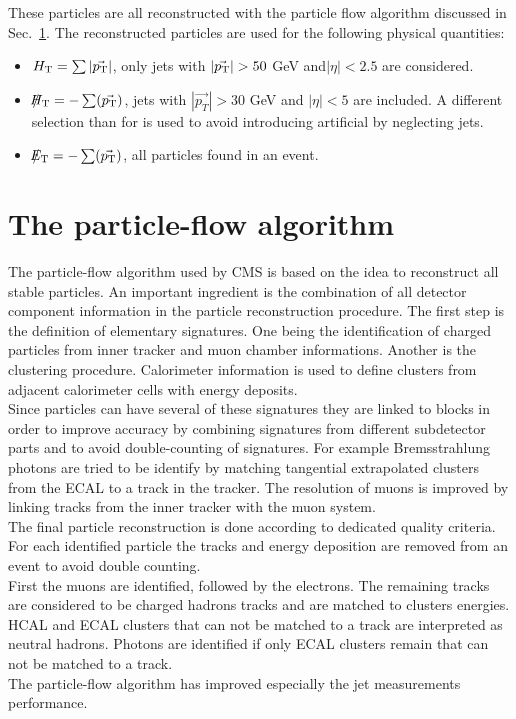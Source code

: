 These particles are all reconstructed with the particle flow algorithm discussed in  Sec.~\ref{sec:particleflow}. The reconstructed particles are used for the following physical quantities:
\begin{itemize}
 \item $H_{\text{T}}=\sum|\vec{p_{\text{T}}}|$, only jets with $|\vec{p_{\text{T}}}| > 50 $ GeV and$|\eta| < 2.5$ are considered.
 \item $\slash\mkern-12mu{H}_{\text{T}} = -\sum (\vec{p_{\text{T}}})$, jets with $|\vec{p_{T}}| > 30$ GeV and $|\eta| < 5$ are included. A different selection than for \HT is used to avoid introducing artificial \MHT by neglecting jets.
 \item $\slash\mkern-12mu{E}_{\text{T}} = -\sum (\vec{p_{\text{T}}})$, all particles \pt found in an event.
\end{itemize}


\section{The particle-flow algorithm}
\label{sec:particleflow}

The particle-flow algorithm used by CMS is based on the idea to reconstruct all stable particles. An important ingredient is the combination of all detector component information in the particle reconstruction procedure. 
The first step is the definition of elementary signatures. One being the identification of charged particles from inner tracker and muon chamber informations. Another is the clustering procedure. Calorimeter information is used to define clusters from adjacent calorimeter cells with energy deposits.\\ 
Since particles can have several of these signatures they are linked to blocks in order to improve accuracy by combining signatures from different subdetector parts and to avoid double-counting of signatures. For example Bremsstrahlung photons  are tried to be identify by matching tangential extrapolated clusters from the ECAL to a track in the tracker. The resolution of muons is improved by linking tracks from the inner tracker with the muon system.\\
The final particle reconstruction is done according to dedicated quality criteria. For each identified particle the tracks and energy deposition are removed from an event to avoid double counting.\\
First the muons are identified, followed by the electrons. The remaining tracks are considered to be charged hadrons tracks and are matched to clusters energies. HCAL and ECAL clusters that can not be matched to a track are interpreted as neutral hadrons. Photons are identified if only ECAL clusters remain that can not be matched to a track.\\
The particle-flow algorithm has improved especially the jet measurements performance\cite{CMS-PAS-PFT-09-001}\cite{1748-0221-6-11-P11002}.

